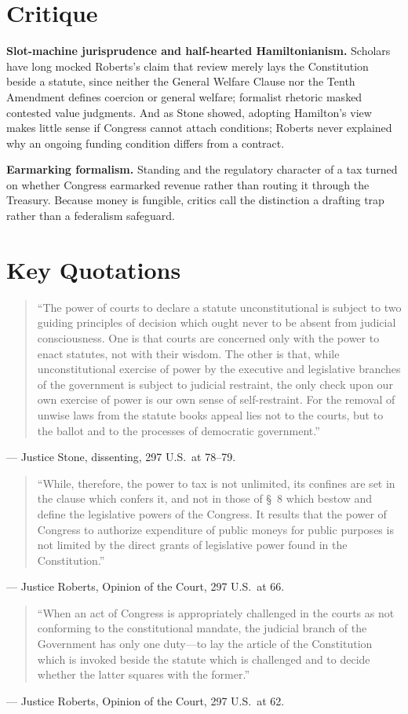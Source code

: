 \documentclass[12pt]{article}
\begin{document}
\section{Critique}

\textbf{Slot-machine jurisprudence and half-hearted Hamiltonianism.} Scholars have long mocked Roberts's claim that review merely lays the Constitution beside a statute, since neither the General Welfare Clause nor the Tenth Amendment defines coercion or general welfare; formalist rhetoric masked contested value judgments. And as Stone showed, adopting Hamilton's view makes little sense if Congress cannot attach conditions; Roberts never explained why an ongoing funding condition differs from a contract.

\textbf{Earmarking formalism.} Standing and the regulatory character of a tax turned on whether Congress earmarked revenue rather than routing it through the Treasury. Because money is fungible, critics call the distinction a drafting trap rather than a federalism safeguard.

\section{Key Quotations}

\begin{quote}
``The power of courts to declare a statute unconstitutional is subject to two guiding principles of decision which ought never to be absent from judicial consciousness. One is that courts are concerned only with the power to enact statutes, not with their wisdom. The other is that, while unconstitutional exercise of power by the executive and legislative branches of the government is subject to judicial restraint, the only check upon our own exercise of power is our own sense of self-restraint. For the removal of unwise laws from the statute books appeal lies not to the courts, but to the ballot and to the processes of democratic government.''
\end{quote}
\noindent --- Justice Stone, dissenting, 297 U.S.\ at 78--79.

\begin{quote}
``While, therefore, the power to tax is not unlimited, its confines are set in the clause which confers it, and not in those of \S\ 8 which bestow and define the legislative powers of the Congress. It results that the power of Congress to authorize expenditure of public moneys for public purposes is not limited by the direct grants of legislative power found in the Constitution.''
\end{quote}
\noindent --- Justice Roberts, Opinion of the Court, 297 U.S.\ at 66.

\begin{quote}
``When an act of Congress is appropriately challenged in the courts as not conforming to the constitutional mandate, the judicial branch of the Government has only one duty---to lay the article of the Constitution which is invoked beside the statute which is challenged and to decide whether the latter squares with the former.''
\end{quote}
\noindent --- Justice Roberts, Opinion of the Court, 297 U.S.\ at 62.
\end{document}
